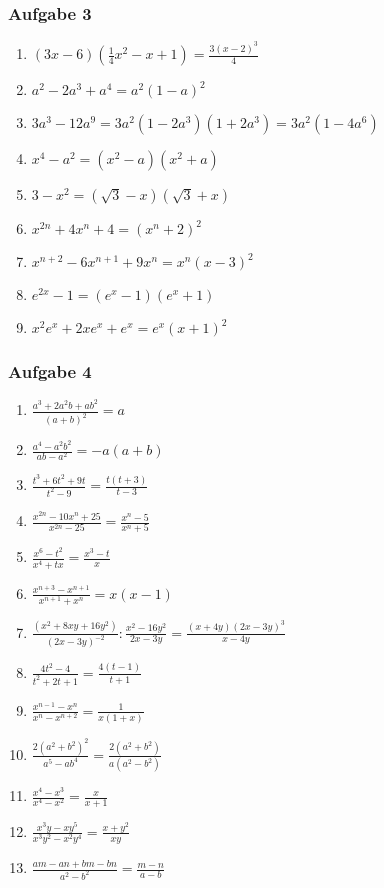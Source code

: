 \subsubsection{Aufgabe 3}
\begin{enumerate}
	\item \quad $ (3x-6)\left(\frac{1}{4}x^2 - x + 1\right)=\frac{3(x-2)^3}{4} $			%
	\item \quad $ a^2 - 2a^3 + a^4=a^2(1-a)^2 $							%
	\item \quad $  3a^3 - 12a^9=3a^2(1-2a^3)(1+2a^3)=3a^2(1-4a^6) $		%
	\item \quad $ x^4 - a^2 =(x^2-a)(x^2+a) $					%
	\item \quad $ 3-x^2 =(\sqrt{3}-x)(\sqrt{3}+x) $%
	\item \quad $ x^{2n} + 4x^n + 4 =(x^n + 2)^2 $							%
	\item \quad $ x^{n+2} -6x^{n+1} + 9x^n =x^n(x-3)^2 $							%
	\item \quad $ e^{2x}-1 =(e^x-1)(e^x+1) $					%
	\item \quad $ x^2e^x + 2xe^x +e^x =e^x(x+1)^2 $							%
\end{enumerate}

\subsubsection{Aufgabe 4} 
\begin{enumerate}
	\item \quad $ \frac{a^3+2a^2b+ab^2}{(a+b)^2} =a $															%
	\item \quad $ \frac{a^4-a^2b^2}{ab-a^2}=-a(a+b) $												%
	\item \quad $ \frac{t^3+6t^2+9t}{t^2-9} =\frac{t(t+3)}{t-3} $						%
	\item \quad $ \frac{x^{2n}-10x^n+25}{x^{2n}-25}=\frac{x^n-5}{x^n+5} $						%
	\item \quad $ \frac{x^6-t^2}{x^4+tx} =\frac{x^3-t}{x} $								%
	\item \quad $ \frac{x^{n+3}-x^{n+1}}{x^{n+1}+x^n}=x(x-1) $												%
	\item \quad $ \frac{(x^2+8xy+16y^2)}{(2x-3y)^{-2}} : \frac{x^2-16y^2}{2x-3y}=\frac{(x+4y)(2x-3y)^3}{x-4y} $	%
	\item \quad $ \frac{4t^2-4}{t^2+2t+1} =\frac{4(t-1)}{t+1} $						%
	\item \quad $ \frac{x^{n-1}-x^n}{x^n-x^{n+2}}=\frac{1}{x(1+x)} $							%
	\item \quad $ \frac{2(a^2+b^2)^2}{a^5-ab^4}=\frac{2(a^2+b^2)}{a(a^2-b^2)} $	%
	\item \quad $ \frac{x^4-x^3}{x^4-x^2} =\frac{x}{x+1} $									%
	\item \quad $ \frac{x^3y-xy^5}{x^3y^2-x^2y^4}=\frac{x+y^2}{xy} $							%
	\item \quad $ \frac{am-an+bm-bn}{a^2-b^2} =\frac{m-n}{a-b} $								%
\end{enumerate}

